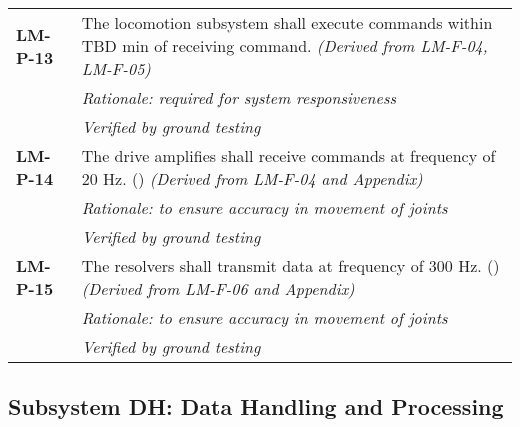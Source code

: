 \begin{longtable}{P{2cm}P{13.75cm}}
\textbf{LM-P-13}	& The locomotion subsystem shall execute commands within \gls{TBD} \gls{min} of receiving command. \textit{(Derived from LM-F-04, LM-F-05)} \\
 &	\textit{Rationale: required for system responsiveness} \\
 &	\textit{Verified by ground testing}	\\

\textbf{LM-P-14}	& The drive amplifies shall receive commands at frequency of 20 \gls{Hz}. (\textit{}) \textit{(Derived from LM-F-04 and Appendix)} \\
 &	\textit{Rationale: to ensure accuracy in movement of joints} \\
 &	\textit{Verified by ground testing}	\\
 
\textbf{LM-P-15}	& The resolvers shall transmit data at frequency of 300 \gls{Hz}. (\textit{}) \textit{(Derived from LM-F-06 and Appendix)} \\
 &	\textit{Rationale: to ensure accuracy in movement of joints} \\
 &	\textit{Verified by ground testing}
\end{longtable}

\subsection{Subsystem DH: Data Handling and Processing}
\label{req_DH}
